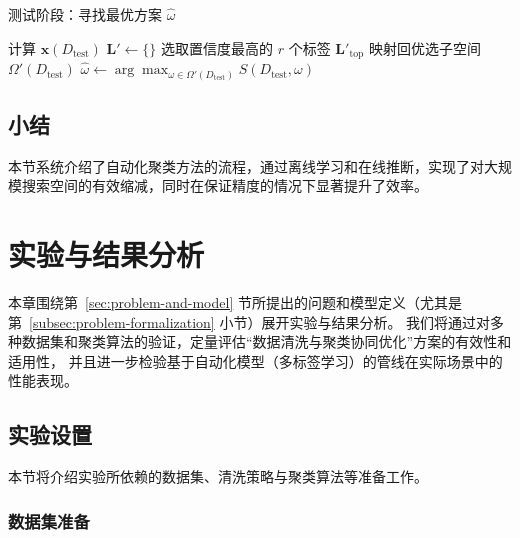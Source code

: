 \documentclass[10pt]{article} %
\numberwithin{equation}{section}
\begin{document}
\begin{algorithm}[H]
\caption{测试阶段：寻找最优方案 \(\hat{\omega}\)}
\label{alg:test-phase}

计算 $\mathbf{x}(D_{\text{test}})$\;
$\mathbf{L}' \leftarrow \{\}$\;
选取置信度最高的 $r$ 个标签 $\mathbf{L}'_{\mathrm{top}}$\;
映射回优选子空间 $\Omega'(D_{\text{test}})$\;
$\hat{\omega} \leftarrow \arg\max_{\omega \in \Omega'(D_{\text{test}})}S(D_{\text{test}}, \omega)$\;
\KwRet{$\hat{\omega}$}
\end{algorithm}

\subsection{小结}
本节系统介绍了自动化聚类方法的流程，通过离线学习和在线推断，实现了对大规模搜索空间的有效缩减，同时在保证精度的情况下显著提升了效率。


\section{实验与结果分析}
\label{sec:chapter5}

本章围绕第~\ref{sec:problem-and-model} 节所提出的问题和模型定义（尤其是第~\ref{subsec:problem-formalization} 小节）展开实验与结果分析。
我们将通过对多种数据集和聚类算法的验证，定量评估“数据清洗与聚类协同优化”方案的有效性和适用性，
并且进一步检验基于自动化模型（多标签学习）的管线在实际场景中的性能表现。

\subsection{实验设置}
\label{sec:exp_setting}

本节将介绍实验所依赖的数据集、清洗策略与聚类算法等准备工作。

\subsubsection{数据集准备}
\label{sec:dataset_prep}
\end{document}

